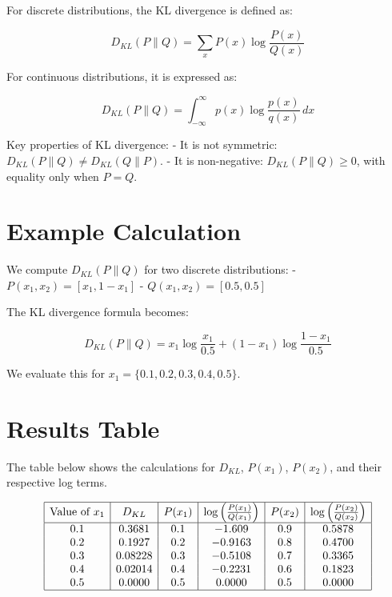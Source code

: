 \documentclass[
  12 pt,
  a4paper,
]{book}
\numberwithin{equation}{section}
\theoremstyle{plain}      %
\theoremstyle{definition} %
\theoremstyle{remark}     %
\theoremstyle{note}         %
\begin{document}
For discrete distributions, the KL divergence is defined as:

\[
D_{KL}(P \| Q) = \sum_{x} P(x) \log \frac{P(x)}{Q(x)}
\]

For continuous distributions, it is expressed as:

\[
D_{KL}(P \| Q) = \int_{-\infty}^\infty p(x) \log \frac{p(x)}{q(x)} \, dx
\]

Key properties of KL divergence: - It is not symmetric:
\(D_{KL}(P \| Q) \neq D_{KL}(Q \| P)\). - It is non-negative:
\(D_{KL}(P \| Q) \geq 0\), with equality only when \(P = Q\).

\hypertarget{example-calculation}{%
\section{Example Calculation}\label{example-calculation}}

We compute \(D_{KL}(P \| Q)\) for two discrete distributions: -
\(P(x_1, x_2) = [x_1, 1-x_1]\) - \(Q(x_1, x_2) = [0.5, 0.5]\)

The KL divergence formula becomes:

\[
D_{KL}(P \| Q) = x_1 \log \frac{x_1}{0.5} + (1 - x_1) \log \frac{1 - x_1}{0.5}
\]

We evaluate this for \(x_1 = \{0.1, 0.2, 0.3, 0.4, 0.5\}\).

\hypertarget{results-table}{%
\section{Results Table}\label{results-table}}

The table below shows the calculations for \(D_{KL}\), \(P(x_1)\),
\(P(x_2)\), and their respective log terms.

\[
\begin{array}{|c|c|c|c|c|c|}
\hline
\text{Value of } x_1 & D_{KL} & P(x_1) & \log \left(\frac{P(x_1)}{Q(x_1)}\right) & P(x_2) & \log \left(\frac{P(x_2)}{Q(x_2)}\right) \\
\hline
0.1 & 0.3681 & 0.1 & -1.609 & 0.9 & 0.5878 \\
0.2 & 0.1927 & 0.2 & -0.9163 & 0.8 & 0.4700 \\
0.3 & 0.08228 & 0.3 & -0.5108 & 0.7 & 0.3365 \\
0.4 & 0.02014 & 0.4 & -0.2231 & 0.6 & 0.1823 \\
0.5 & 0.0000 & 0.5 & 0.0000 & 0.5 & 0.0000 \\
\hline
\end{array}
\]
\end{document}
